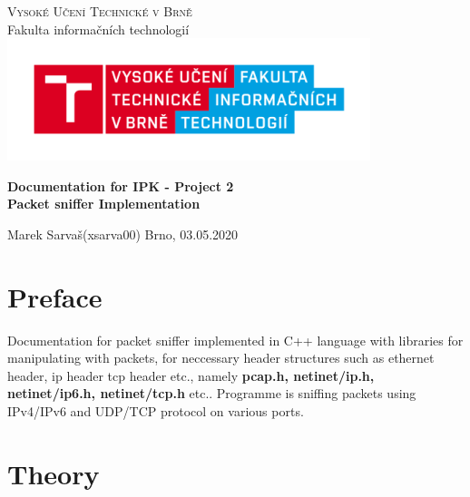 \documentclass{article}
\begin{document}

	\begin{titlepage}
		\begin{center}
			\textsc{\Huge Vysoké Učení Technické v Brně} \\[0.7cm]
			{\Huge Fakulta informačních technologií}
			\center\includegraphics[width=0.5\linewidth]{./logo.png}

			\vspace{5cm}

			\textbf{{\Huge Documentation for IPK - Project 2}}\\[0.4cm]
			\textbf{{\LARGE Packet sniffer Implementation}}\\[0.4cm]
	
			
		\end{center}
		\vfill

		\begin{flushleft}
			\begin{Large}
				
				Marek Sarvaš\hspace{37px}(xsarva00)\hspace{19px} 
			\hfill
			Brno, 03.05.2020
			\end{Large}
		\end{flushleft}

	\end{titlepage}


	\tableofcontents
	\newpage
\section{Preface}
Documentation for packet sniffer implemented in C++ language with libraries for manipulating with packets, for neccessary header structures such as ethernet header, ip header tcp header etc., namely \textbf{pcap.h, netinet/ip.h, netinet/ip6.h, netinet/tcp.h} etc.. Programme is sniffing packets using IPv4/IPv6 and UDP/TCP protocol on various ports.  
\section{Theory}
\end{document}
